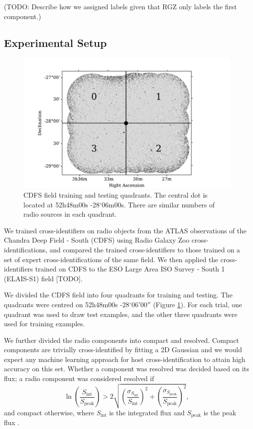 \documentclass[fleqn,usenatbib,usedcolumn]{mnras}
\newcommand{\text}{\mathrm}
\begin{document}
    (TODO: Describe how we assigned labels given that RGZ only labels the
    first component.)

  \subsection{Experimental Setup}\label{experimental-setup}

    \begin{figure}
      \centering
      \includegraphics[width=\columnwidth]{images/quadrants.pdf}
      \caption{CDFS field training and testing quadrants. The central dot is
        located at 52h48m00s -28$^\circ$06m00s. There are similar numbers of
        radio sources in each quadrant.\label{fig:quadrants}}
    \end{figure}

    We trained cross-identifiers on radio objects from the ATLAS
    observations of the Chandra Deep Field - South (CDFS) using Radio Galaxy
    Zoo cross-identifications, and compared the trained cross-identifiers to
    those trained on a set of expert cross-identifications of the same
    field. We then applied the cross-identifiers trained on CDFS to the ESO
    Large Area ISO Survey - South 1 (ELAIS-S1) field {[}TODO{]}.

    We divided the CDFS field into four quadrants for training and testing.
    The quadrants were centred on 52h48m00s -28$^\circ$06$'$00$''$
    (Figure \ref{fig:quadrants}). For each trial, one quadrant
    was used to draw test examples, and the other three quadrants were used
    for training examples.

    We further divided the radio components into compact and resolved. Compact
    components are trivially cross-identified by fitting a 2D Gaussian \citep[as
    in][]{norris06} and we would expect any machine learning approach for host
    cross-identification to attain high accuracy on this set. Whether a
    component was resolved was decided based on its flux; a radio component
    was considered resolved if
    \[
        \ln \left(
          \frac{S_{\text{int}}}
               {S_{\text{peak}}}
        \right) > 2\sqrt{\left(
          \frac{\sigma_{S_{\text{int}}}}
               {S_{\text{int}}}
        \right)^2 + \left(
          \frac{\sigma_{S_{\text{peak}}}}
               {S_{\text{peak}}}
        \right)^2},
    \] and compact otherwise, where \(S_{\text{int}}\) is the integrated
    flux and \(S_{\text{peak}}\) is the peak flux \citep{franzen15}.
\end{document}
